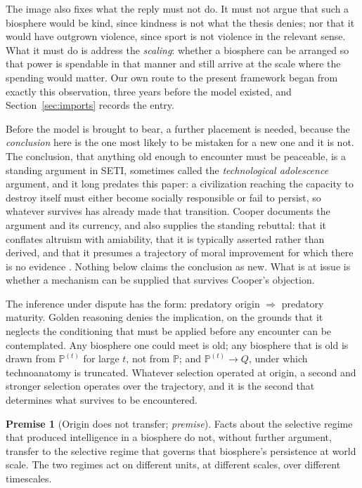 \documentclass[11pt]{article}
\newcommand{\PP}{\mathbb{P}}
\theoremstyle{plain}
\theoremstyle{definition}
\newtheorem{premise}{Premise}
\theoremstyle{remark}
\begin{document}
The image also fixes what the reply must not do. It must not argue that
such a biosphere would be kind, since kindness is not what the thesis
denies; nor that it would have outgrown violence, since sport is not
violence in the relevant sense. What it must do is address the
\emph{scaling}: whether a biosphere can be arranged so that power is
spendable in that manner and still arrive at the scale where the
spending would matter. Our own route to the present framework
began from exactly this observation, three years before the model
existed, and Section~\ref{sec:imports} records the entry.

Before the model is brought to bear, a further placement is needed, because the \emph{conclusion} here is the one most likely to be mistaken
for a new one and it is not. The conclusion, that anything old enough to encounter must be
peaceable, is a standing argument in SETI, sometimes called the
\emph{technological adolescence} argument, and it long predates this
paper: a civilization reaching the capacity to destroy itself must
either become socially responsible or fail to persist, so whatever
survives has already made that transition. Cooper documents the
argument and its currency, and also supplies the standing rebuttal: that
it conflates altruism with amiability, that it is typically asserted
rather than derived, and that it presumes a trajectory of moral
improvement for which there is no evidence \cite{Cooper19}. Nothing
below claims the conclusion as new. What is at issue is whether a
mechanism can be supplied that survives Cooper's objection.

The inference under dispute has the form: predatory origin
$\Rightarrow$ predatory maturity. Golden reasoning denies the
implication, on the grounds that it neglects the conditioning that must
be applied before any encounter can be contemplated. Any biosphere one could meet is old; any biosphere
that is old is drawn from $\PP^{(t)}$ for large $t$, not from $\PP$; and
$\PP^{(t)}\to Q$, under which technoanatomy is truncated. Whatever
selection operated at origin, a second and stronger selection operates
over the trajectory, and it is the second that determines what survives
to be encountered.

\setcounter{premise}{3} %
\begin{premise}[Origin does not transfer; \emph{premise}]
\label{gr:phi4}
Facts about the selective regime that produced intelligence in a
biosphere do not, without further argument, transfer to the selective
regime that governs that biosphere's persistence at world scale. The two
regimes act on different units, at different scales, over different
timescales.
\end{premise}
\end{document}
